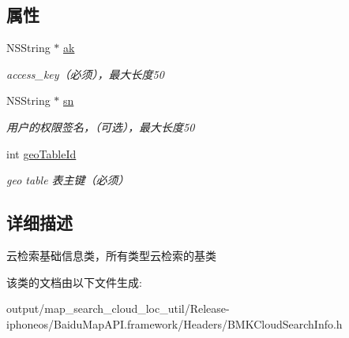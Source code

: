 \subsection*{属性}
\begin{DoxyCompactItemize}
\item 
\hypertarget{interface_b_m_k_base_cloud_search_info_a3ac025d61069505d4ff685e4c77b78a4}{}N\+S\+String $\ast$ \hyperlink{interface_b_m_k_base_cloud_search_info_a3ac025d61069505d4ff685e4c77b78a4}{ak}\label{interface_b_m_k_base_cloud_search_info_a3ac025d61069505d4ff685e4c77b78a4}

\begin{DoxyCompactList}\small\item\em access\+\_\+key（必须），最大长度50 \end{DoxyCompactList}\item 
\hypertarget{interface_b_m_k_base_cloud_search_info_a0dcbea8108d264a217566025d43aff12}{}N\+S\+String $\ast$ \hyperlink{interface_b_m_k_base_cloud_search_info_a0dcbea8108d264a217566025d43aff12}{sn}\label{interface_b_m_k_base_cloud_search_info_a0dcbea8108d264a217566025d43aff12}

\begin{DoxyCompactList}\small\item\em 用户的权限签名，（可选），最大长度50 \end{DoxyCompactList}\item 
\hypertarget{interface_b_m_k_base_cloud_search_info_acb6f48270abf3f46a0412bcd658d099c}{}int \hyperlink{interface_b_m_k_base_cloud_search_info_acb6f48270abf3f46a0412bcd658d099c}{geo\+Table\+Id}\label{interface_b_m_k_base_cloud_search_info_acb6f48270abf3f46a0412bcd658d099c}

\begin{DoxyCompactList}\small\item\em geo table 表主键（必须） \end{DoxyCompactList}\end{DoxyCompactItemize}


\subsection{详细描述}
云检索基础信息类，所有类型云检索的基类 

该类的文档由以下文件生成\+:\begin{DoxyCompactItemize}
\item 
output/map\+\_\+search\+\_\+cloud\+\_\+loc\+\_\+util/\+Release-\/iphoneos/\+Baidu\+Map\+A\+P\+I.\+framework/\+Headers/B\+M\+K\+Cloud\+Search\+Info.\+h\end{DoxyCompactItemize}
